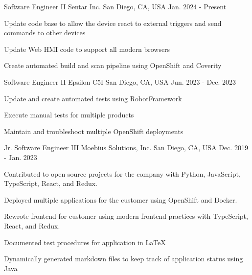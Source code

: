 

\begin{cventries}

	\cventry
	{Software Engineer II} %
	{Sentar Inc.} %
	{San Diego, CA, USA} %
	{Jan. 2024 - Present} %
	{
		\begin{cvitems}
			\item {Update code base to allow the device react to external triggers and send commands to other devices}
			\item {Update Web HMI code to support all modern browsers}
			\item {Create automated build and scan pipeline using OpenShift and Coverity}
		\end{cvitems}
	}

	\cventry
	{Software Engineer II} %
	{Epsilon C5I} %
	{San Diego, CA, USA} %
	{Jun. 2023 - Dec. 2023} %
	{
		\begin{cvitems}
			\item {Update and create automated tests using RobotFramework}
			\item {Execute manual tests for multiple products}
			\item {Maintain and troubleshoot multiple OpenShift deployments}
		\end{cvitems}
	}

	\cventry
	{Jr. Software Engineer III} %
	{Moebius Solutions, Inc.} %
	{San Diego, CA, USA} %
	{Dec. 2019 - Jan. 2023} %
	{
		\begin{cvitems} %
			\item {Contributed to open source projects for the company with Python, JavaScript, TypeScript, React, and Redux.}
			\item {Deployed multiple applications for the customer using OpenShift and Docker.}
			\item {Rewrote frontend for customer using modern frontend practices with TypeScript, React, and Redux.}
			\item {Documented test procedures for application in LaTeX}
			\item {Dynamically generated markdown files to keep track of application status using Java}
		\end{cvitems}
	}


\end{cventries}
